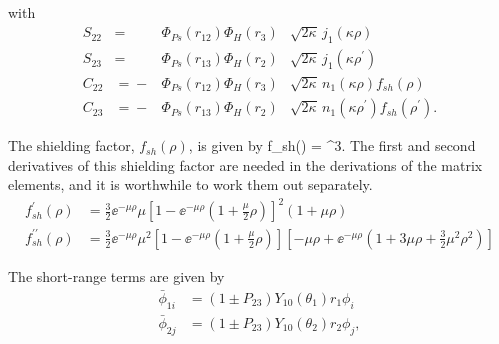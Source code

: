 \documentclass[Dissertation.tex]{subfiles}
\begin{document}
\noindent with
\begin{subequations}
\label{eq:PWaveSandC}
\begin{alignat}{2}
S_{22} &={}&\Phi_{Ps}\left(r_{12}\right) \Phi_H\left(r_3\right) &\sqrt{2\kappa} \,j_1\!\left(\kappa\rho\right) \label{eq:PWaveS22Def} \\
S_{23} &={}&\Phi_{Ps}\left(r_{13}\right) \Phi_H\left(r_2\right) &\sqrt{2\kappa} \,j_1\!\left(\kappa\rho^\prime\right) \label{eq:PWaveS23Def} \\
C_{22} &={}-&\Phi_{Ps}\left(r_{12}\right) \Phi_H\left(r_3\right) &\sqrt{2\kappa} \,n_1\!\left(\kappa\rho\right) f_{sh}(\rho) \label{eq:PWaveC22Def} \\
C_{23} &={}-&\Phi_{Ps}\left(r_{13}\right) \Phi_H\left(r_2\right) &\sqrt{2\kappa} \,n_1\!\left(\kappa\rho^\prime\right) f_{sh}(\rho^\prime). \label{eq:PWaveC23Def}
\end{alignat}
\end{subequations}

\noindent The shielding factor, $f_{sh}(\rho)$, is given by
\beq
f_{sh}(\rho) = ^3.
\label{eq:PWaveShielding}
\eeq
The first and second derivatives of this shielding factor are needed in the derivations of the matrix elements, and it is worthwhile to work them out separately.
\begin{subequations}
\label{eq:PWaveShieldingDer}
\begin{align}
f_{sh}^\prime(\rho) &= \frac{3}{2} \ee^{-\mu \rho} \mu \left[1 - \ee^{-\mu \rho} \left(1+\frac{\mu}{2}\rho\right)\right]^2 (1 + \mu\rho) \label{eq:PWaveShielding1} \\
f_{sh}^{\prime\prime}(\rho) &= \frac{3}{2} \ee^{-\mu \rho} \mu^2 \left[1 - \ee^{-\mu \rho} \left(1+\frac{\mu}{2}\rho\right)\right] \left[-\mu\rho + \ee^{-\mu \rho} \left(1+3\mu\rho+\frac{3}{2}\mu^2\rho^2\right)\right] \label{eq:PWaveShielding2}
\end{align}
\end{subequations}

\noindent The short-range terms are given by
\begin{subequations}
\label{eq:PWavePhiBar}
\begin{align}
\bar{\phi}_{1i} &= \left(1 \pm P_{23}\right) Y_{10}(\theta_1) r_1 \phi_i \label{eq:PWavePhi1i}\\
\bar{\phi}_{2j} &= \left(1 \pm P_{23}\right) Y_{10}(\theta_2) r_2 \phi_j \label{eq:PWavePhi2j},
\end{align}
\end{subequations}
\end{document}
